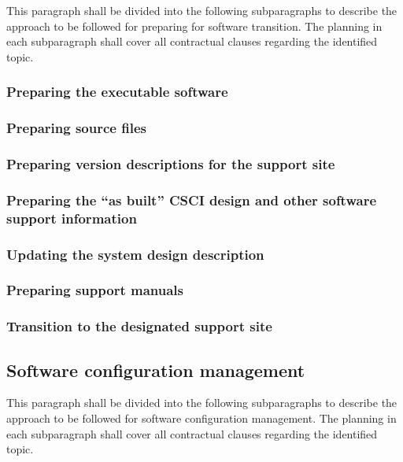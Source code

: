 This paragraph shall be divided into the following subparagraphs to
describe the approach to be followed for preparing for software
transition. The planning in each subparagraph shall cover all
contractual clauses regarding the identified topic.

\subsubsection{Preparing the executable software}

\subsubsection{Preparing source files}

\subsubsection{Preparing version descriptions for the support site}

\subsubsection{Preparing the ``as built'' CSCI design and other
software support information}

\subsubsection{Updating the system design description}

\subsubsection{Preparing support manuals}

\subsubsection{Transition to the designated support site}

\subsection{Software configuration management}

This paragraph shall be divided into the following subparagraphs to
describe the approach to be followed for software configuration
management. The planning in each subparagraph shall cover all
contractual clauses regarding the identified topic.

